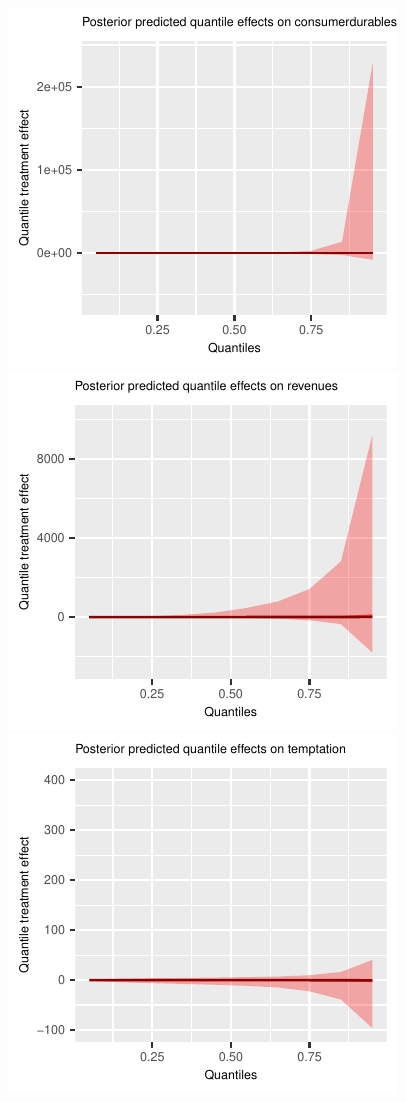 \documentclass[english,12pt]{article}\usepackage{lmodern}
\numberwithin{equation}{section}
\begin{document}
\begin{figure}[h!]
    \includegraphics[scale=0.4]{posterior_predicted_quantile_TEs_consumerdurables_lognormal.pdf}
        \includegraphics[scale=0.4]{posterior_predicted_quantile_TEs_revenues_lognormal.pdf}\\
    \includegraphics[scale=0.4]{posterior_predicted_quantile_TEs_temptation_lognormal.pdf}

\end{figure}
\end{document}
